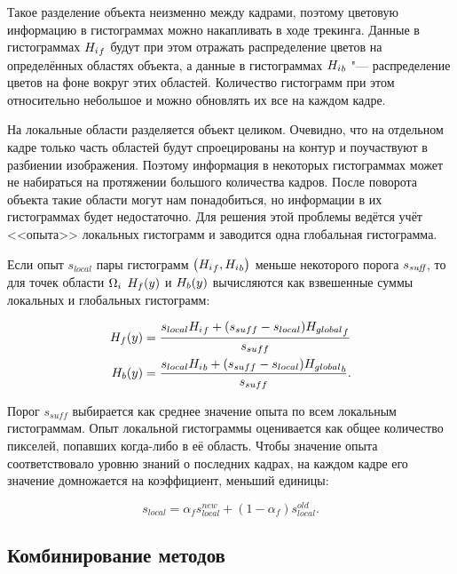 Такое разделение объекта неизменно между кадрами, поэтому цветовую информацию
в гистограммах можно накапливать в ходе трекинга.
Данные в гистограммах ${H_i}_f$ будут при этом отражать распределение
цветов на определённых областях объекта, а данные в гистограммах ${H_i}_b$
"--- распределение цветов на фоне вокруг этих областей.
Количество гистограмм при этом относительно небольшое и можно 
обновлять их все на каждом кадре.

На локальные области разделяется объект целиком. 
Очевидно, что на отдельном кадре только часть областей будут спроецированы на
контур и поучаствуют в разбиении изображения.
Поэтому информация в некоторых гистограммах может не набираться на протяжении
большого количества кадров.
После поворота объекта такие области могут нам понадобиться, но информации в
их гистограммах будет недостаточно.
Для решения этой проблемы ведётся учёт <<опыта>> локальных гистограмм и
заводится одна глобальная гистограмма.

Если опыт $s_{local}$ пары гистограмм $\left( {H_i}_f, {H_i}_b \right)$
меньше некоторого порога
$s_{\text{\it suff}}$, то для точек области $\Omega_i$ $H_f(y)$ и $H_b(y)$ вычисляются
как
взвешенные суммы локальных и глобальных гистограмм:

\begin{align}
\label{eqn:histo_skill}
    H_f(y) &= \dfrac{s_{local} {H_i}_f + (s_{suff} - s_{local})
        {H_{global}}_f}{s_{suff}} \\
    H_b(y) &= \dfrac{s_{local} {H_i}_b + (s_{suff} - s_{local})
        {H_{global}}_b}{s_{suff}}
\text{.}
\end{align}

Порог $s_{suff}$ выбирается как среднее значение опыта по всем локальным
гистограммам.
Опыт локальной гистограммы оценивается как общее количество пикселей, попавших
когда-либо в её область.
Чтобы значение опыта соответствовало уровню знаний о последних кадрах, на
каждом кадре его значение домножается на коэффициент, меньший единицы:

\begin{equation}
s_{local} =  \alpha_f s_{local}^{new} + (1 - \alpha_f)  s_{local}^{old} 
\text{.}
\end{equation}


\subsection{Комбинирование методов}

